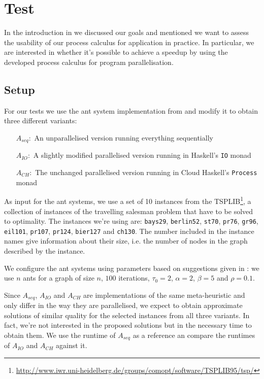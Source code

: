 \chapter{Test}
\label{chp:test}
In the introduction in  we discussed our goals and mentioned we want to assess the usability of our process calculus for application in practice. In particular, we are interested in whether it's possible to achieve a speedup by using the developed process calculus for program parallelisation.

\section{Setup}
For our tests we use the ant system implementation from  and modify it to obtain three different variants:
\begin{itemize}
  \item[$A_{seq}\colon$] An unparallelised version running everything sequentially
  \item[$A_{IO}\colon$] A slightly modified parallelised version running in \textsf{Haskell}'s \texttt{IO} monad
  \item[$A_{CH}\colon$] The unchanged parallelised version running in {Cloud Haskell}'s \texttt{Process} monad
\end{itemize}

As input for the ant systems, we use a set of 10 instances from the TSPLIB\footnote{\url{http://www.iwr.uni-heidelberg.de/groups/comopt/software/TSPLIB95/tsp/}}, a collection of instances of the travelling salesman problem that have to be solved to optimality. The instances we're using are: \texttt{bays29}, \texttt{berlin52}, \texttt{st70}, \texttt{pr76}, \texttt{gr96}, \texttt{eil101}, \texttt{pr107}, \texttt{pr124}, \texttt{bier127} and \texttt{ch130}. The number included in the instance names give information about their size, i.e. the number of nodes in the graph described by the instance.

We configure the ant systems using parameters based on suggestions given in \cite{Dorigo:2004:ACO:975277}: we use $n$ ants for a graph of size $n$, $100$ iterations, $\tau_0 = 2$, $\alpha = 2$, $\beta = 5$ and $\rho = 0.1$.

Since $A_{seq}$, $A_{IO}$ and $A_{CH}$ are implementations of the same meta-heuristic and only differ in the way they are parallelised, we expect to obtain approximate solutions of similar quality for the selected instances from all three variants. In fact, we're not interested in the proposed solutions but in the necessary time to obtain them. We use the runtime of $A_{seq}$ as a reference an compare the runtimes of $A_{IO}$ and $A_{CH}$ against it.

